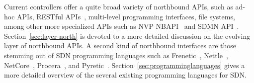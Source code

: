 Current controllers offer a quite broad variety of northbound APIs, such as ad-hoc APIs, RESTful APIs~\cite{richardson2008restful}, 
multi-level programming interfaces, file systems, among other more specialized APIs such as NVP NBAPI~\cite{koponen-1,koponen} and SDMN API~\cite{pentikousis2013}. %
 Section~\ref{sec:layer-north} is devoted to a more detailed discussion on the evolving layer of northbound APIs.  
 A second kind of northbound interfaces are those stemming out of SDN programming languages such as  
Frenetic~\cite{foster2011}, Nettle~\cite{voellmy2011-1},
NetCore~\cite{monsanto2012}, Procera~\cite{voellmy2012}, 
and Pyretic~\cite{monsanto2013}.  Section~\ref{sec:programminglanguages} gives a more detailed 
overview of the several existing programming languages for SDN.



